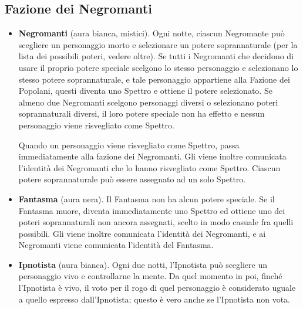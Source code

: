 \documentclass[a4paper,10pt]{article}
\begin{document}
\subsection*{Fazione dei Negromanti}
\label{negromanti}

\begin{itemize}

	\item {\bf Negromanti} (aura bianca, mistici). Ogni notte, ciascun Negromante può scegliere un personaggio morto e selezionare un potere soprannaturale (per la lista dei possibili poteri, vedere oltre). Se tutti i Negromanti che decidono di usare il proprio potere speciale scelgono lo stesso personaggio e selezionano lo stesso potere soprannaturale, e tale personaggio appartiene alla Fazione dei Popolani, questi diventa uno Spettro e ottiene il potere selezionato. Se almeno due Negromanti scelgono personaggi diversi o selezionano poteri soprannaturali diversi, il loro potere speciale non ha effetto e nessun personaggio viene risvegliato come Spettro.
 
	Quando un personaggio viene risvegliato come Spettro, passa immediatamente alla fazione dei Negromanti. Gli viene inoltre comunicata l'identità dei Negromanti che lo hanno risvegliato come Spettro. Ciascun potere soprannaturale può essere assegnato ad un solo Spettro.
 
 
	\item {\bf Fantasma} (aura nera). Il Fantasma non ha alcun potere speciale. Se il Fantasma muore, diventa immediatamente uno Spettro ed ottiene uno dei poteri soprannaturali non ancora assegnati, scelto in modo casuale fra quelli possibili. Gli viene inoltre comunicata l'identità dei Negromanti, e ai Negromanti viene comunicata l'identità del Fantasma.
 
	\item {\bf Ipnotista} (aura bianca). Ogni due notti, l'Ipnotista può scegliere un personaggio vivo e controllarne la mente. Da quel momento in poi, finché l'Ipnotista è vivo, il voto per il rogo di quel personaggio è considerato uguale a quello espresso dall'Ipnotista; questo è vero anche se l'Ipnotista non vota.
	

\end{itemize}
\end{document}
